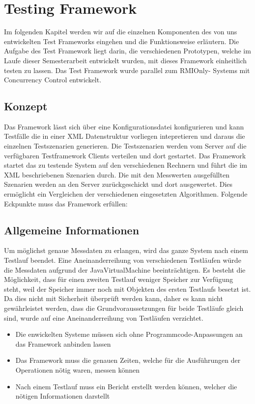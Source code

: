 \chapter{Testing Framework}
Im folgenden Kapitel werden wir auf die einzelnen Komponenten des von uns entwickelten Test Frameworks eingehen und die Funktionsweise erläutern. Die Aufgabe des Test Framework liegt darin, die verschiedenen Prototypen, welche im Laufe dieser Semesterarbeit entwickelt wurden, mit dieses Framework einheitlich testen zu lassen. Das Test Framework wurde parallel zum RMIOnly- Systems mit Concurrency Control entwickelt.

\section{Konzept}
Das Framework lässt sich über eine Konfigurationsdatei konfigurieren und kann Testfälle die in einer XML Datenstruktur vorliegen intepretieren und daraus die einzelnen Testszenarien generieren. Die Testszenarien werden vom Server auf die verfügbaren Testframework Clients verteilen und dort gestartet. Das Framework startet das zu testende System auf den verschiedenen Rechnern und führt die im XML beschriebenen Szenarien durch.\newline
Die mit den Messwerten ausgefüllten Szenarien werden an den Server zurückgeschickt und dort ausgewertet. Dies ermöglicht ein Vergleichen der verschiedenen eingesetzten Algorithmen. Folgende Eckpunkte muss das Framework erfüllen:

\section{Allgemeine Informationen}
\label{sec:allgInformationen}

Um möglichst genaue Messdaten zu erlangen, wird das ganze System nach einem Testlauf beendet. Eine Aneinanderreihung von verschiedenen Testläufen würde die Messdaten aufgrund der JavaVirtualMachine beeinträchtigen. Es besteht die Möglichkeit, dass für einen zweiten Testlauf weniger Speicher zur Verfügung steht, weil der Speicher immer noch mit Objekten des ersten Testlaufs besetzt ist. Da dies nicht mit Sicherheit überprüft werden kann, daher es kann nicht gewährleistet werden, dass die Grundvoraussetzungen für beide Testläufe gleich sind, wurde auf eine Aneinanderreihung von Testläufen verzichtet.

\begin{itemize}
\item Die enwickelten Systeme müssen sich ohne Programmcode-Anpassungen an das Framework anbinden lassen
\item Das Framework muss die genauen Zeiten, welche für die Ausführungen der Operationen nötig waren, messen können
\item Nach einem Testlauf muss ein Bericht erstellt werden können, welcher die nötigen Informationen darstellt
\end{itemize}

